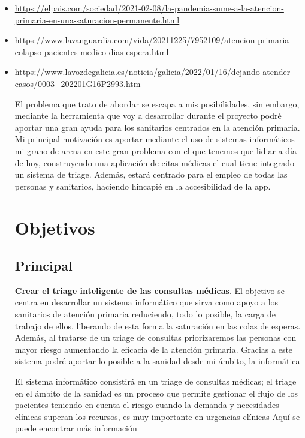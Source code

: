 \begin{itemize}
    \item \url{https://elpais.com/sociedad/2021-02-08/la-pandemia-sume-a-la-atencion-primaria-en-una-saturacion-permanente.html} 
    \item \url{https://www.lavanguardia.com/vida/20211225/7952109/atencion-primaria-colapso-pacientes-medico-dias-espera.html}
    \item \url{https://www.lavozdegalicia.es/noticia/galicia/2022/01/16/dejando-atender-casos/0003_202201G16P2993.htm}

El problema que trato de abordar se escapa a mis posibilidades, sin embargo, mediante la herramienta que voy a desarrollar 
durante el proyecto podré aportar una gran ayuda para los sanitarios centrados en la atención primaria.
Mi principal motivación es aportar mediante el uso de sistemas informáticos mi grano de arena en este gran problema con el que 
tenemos que lidiar a día de hoy, construyendo una aplicación de citas médicas el cual tiene integrado un sistema de triage. 
Además, estará centrado para el empleo de todas las personas y sanitarios, haciendo hincapié en la accesibilidad de la app.

\section{Objetivos}

\subsection{Principal}

\textbf{Crear el triage inteligente de las consultas médicas}. El objetivo se centra en desarrollar un sistema informático que sirva
como apoyo a los sanitarios de atención primaria reduciendo, todo lo posible, la carga de trabajo de ellos, liberando de esta forma 
la saturación en las colas de esperas. Además, al tratarse de un triage de consultas priorizaremos las personas con mayor riesgo 
aumentando la eficacia de la atención primaria. Gracias a este sistema podré aportar lo posible a la sanidad desde mi ámbito, la informática

El sistema informático consistirá en un triage de consultas médicas; el triage en el ámbito de la sanidad es un proceso que permite gestionar
el flujo de los pacientes teniendo en cuenta el riesgo cuando la demanda y necesidades clínicas superan los recursos, es muy importante en urgencias clínicas
\href{https://scielo.isciii.es/scielo.php?script=sci_arttext&pid=S1137-66272010000200008}{Aquí} se puede encontrar más información


\end{itemize}
